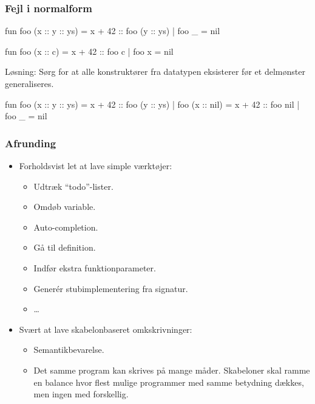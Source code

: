 \documentclass[slidestop,compress,mathserif, xcolor=dvipsnames]{beamer}
\begin{document}
\begin{frame}[fragile]
  \frametitle{Fejl i normalform}

  \begin{block}{}
    \begin{sml}
      fun foo (x :: y :: ys) = x + 42 :: foo (y :: ys)
        | foo _ = nil
    \end{sml}
  \end{block}
  \begin{block}{}
    \begin{sml}
      fun foo (x :: c) = x + 42 :: foo c
        | foo x = nil
    \end{sml}
  \end{block}
  Løsning: Sørg for at alle konstruktører fra datatypen eksisterer før et
  delmønster generaliseres.
  \begin{block}{}
    \begin{sml}
      fun foo (x :: y :: ys) = x + 42 :: foo (y :: ys)
        | foo (x :: nil) = x + 42 :: foo nil
        | foo _ = nil
    \end{sml}
  \end{block}
\end{frame}

\begin{frame}
  \frametitle{Afrunding}

  \begin{itemize}
  \item Forholdsvist let at lave simple værktøjer:
    \begin{itemize}
    \item Udtræk "`todo"'-lister.
    \item Omdøb variable.
    \item Auto-completion.
    \item Gå til definition.
    \item Indfør ekstra funktionparameter.
    \item Generér stubimplementering fra signatur.
    \item \ldots
    \end{itemize}
  \item Svært at lave skabelonbaseret omkskrivninger:
    \begin{itemize}
    \item Semantikbevarelse.
    \item Det samme program kan skrives på mange måder. Skabeloner skal ramme en
      balance hvor flest mulige programmer med samme betydning dækkes, men ingen
      med forskellig.
    \end{itemize}
  \end{itemize}
\end{frame}
\end{document}
